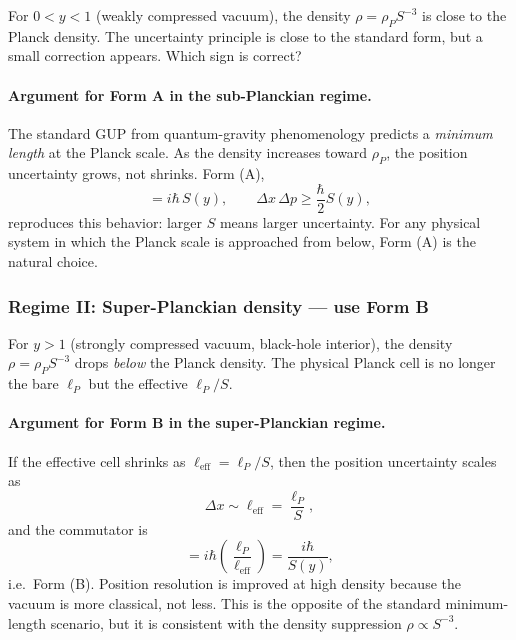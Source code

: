 \documentclass[12pt,oneside,openany]{book}
\begin{document}
For $0<y<1$ (weakly compressed vacuum), the density
$\rho=\rho_{P}S^{-3}$ is close to the Planck density. The
uncertainty principle is close to the standard form, but a
small correction appears. Which sign is correct?

\paragraph{Argument for Form A in the sub-Planckian regime.}
The standard GUP from quantum-gravity phenomenology predicts a
\emph{minimum length} at the Planck scale. As the density
increases toward $\rho_{P}$, the position uncertainty grows, not
shrinks. Form (A),
\begin{equation}
[x,p]=i\hbar\,S(y),
\qquad
\Delta x\,\Delta p\geq\frac{\hbar}{2}S(y),
\label{eq:FormA-sub}
\end{equation}
reproduces this behavior: larger $S$ means larger uncertainty.
For any physical system in which the Planck scale is
approached from below, Form (A) is the natural choice.

\subsubsection{Regime II: Super-Planckian density --- use Form B}

For $y>1$ (strongly compressed vacuum, black-hole interior),
the density $\rho=\rho_{P}S^{-3}$ drops \emph{below} the Planck
density. The physical Planck cell is no longer the bare
$\ell_{P}$ but the effective $\ell_{P}/S$.

\paragraph{Argument for Form B in the super-Planckian regime.}
If the effective cell shrinks as $\ell_{\text{eff}}=\ell_{P}/S$,
then the position uncertainty scales as
\begin{equation}
\Delta x\sim\ell_{\text{eff}}=\frac{\ell_{P}}{S},
\label{eq:Dx-B}
\end{equation}
and the commutator is
\begin{equation}
[x,p]=i\hbar\left(\frac{\ell_{P}}{\ell_{\text{eff}}}\right)
=\frac{i\hbar}{S(y)},
\label{eq:FormB-super}
\end{equation}
i.e.\ Form (B). Position resolution is improved at high density
because the vacuum is more classical, not less. This is the
opposite of the standard minimum-length scenario, but it is
consistent with the density suppression $\rho\propto S^{-3}$.
\end{document}
